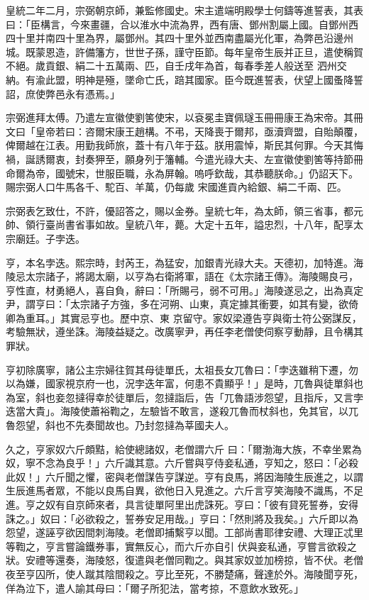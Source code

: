 \begin{pinyinscope}
 皇統二年二月，宗弼朝京師，兼監修國史。宋主遣端明殿學士何鑄等進誓表，其表曰：「臣構言，今來畫疆，合以淮水中流為界，西有唐、鄧州割屬上國。自鄧州西四十里并南四十里為界，屬鄧州。其四十里外並西南盡屬光化軍，為弊邑沿邊州城。既蒙恩造，許備籓方，世世子孫，謹守臣節。每年皇帝生辰并正旦，遣使稱賀不絕。歲貢銀、絹二十五萬兩、匹，自壬戌年為首，每春季差人般送至
 泗州交納。有渝此盟，明神是殛，墜命亡氏，踣其國家。臣今既進誓表，伏望上國蚤降誓詔，庶使弊邑永有憑焉。」



 宗弼進拜太傅。乃遣左宣徽使劉筈使宋，以袞冕圭寶佩璲玉冊冊康王為宋帝。其冊文曰「皇帝若曰：咨爾宋康王趙構。不弔，天降喪于爾邦，亟瀆齊盟，自貽顛覆，俾爾越在江表。用勤我師旅，蓋十有八年于茲。朕用震悼，斯民其何罪。今天其悔禍，誕誘爾衷，封奏狎至，願身列于籓輔。今遣光祿大夫、左宣徽使劉筈等持節冊命爾為帝，國號宋，世服臣職，永為屏翰。嗚呼欽哉，其恭聽朕命。」仍詔天下。賜宗弼人口牛馬各千、駝百、羊萬，仍每歲
 宋國進貢內給銀、絹二千兩、匹。



 宗弼表乞致仕，不許，優詔答之，賜以金券。皇統七年，為太師，領三省事，都元帥、領行臺尚書省事如故。皇統八年，薨。大定十五年，謚忠烈，十八年，配享太宗廟廷。子孛迭。



 亨，本名孛迭。熙宗時，封芮王，為猛安，加銀青光祿大夫。天德初，加特進。海陵忌太宗諸子，將謁太廟，以亨為右衛將軍，語在《太宗諸王傳》。海陵賜良弓，亨性直，材勇絕人，喜自負，辭曰：「所賜弓，弱不可用。」海陵遂忌之，出為真定尹，謂亨曰：「太宗諸子方強，多在河朔、山東，真定據其衝要，如其有變，欲倚卿為重耳。」其實忌亨也。歷中京、東
 京留守。家奴梁遵告亨與衛士符公弼謀反，考驗無狀，遵坐誅。海陵益疑之。改廣寧尹，再任李老僧使伺察亨動靜，且令構其罪狀。



 亨初除廣寧，諸公主宗婦往賀其母徒單氏，太祖長女兀魯曰：「孛迭雖稍下遷，勿以為嫌，國家視京府一也，況孛迭年富，何患不貴顯乎！」是時，兀魯與徒單斜也為室，斜也妾忽撻得幸於徒單后，忽撻詣后，告「兀魯語涉怨望，且指斥，又言孛迭當大貴」。海陵使蕭裕鞫之，左驗皆不敢言，遂殺兀魯而杖斜也，免其官，以兀魯怨望，斜也不先奏聞故也。乃封忽撻為莘國夫人。



 久之，亨家奴六斤頗黠，給使總諸奴，老僧謂六斤
 曰：「爾渤海大族，不幸坐累為奴，寧不念為良乎！」六斤識其意。六斤嘗與亨侍妾私通，亨知之，怒曰：「必殺此奴！」六斤聞之懼，密與老僧謀告亨謀逆。亨有良馬，將因海陵生辰進之，以謂生辰進馬者眾，不能以良馬自異，欲他日入見進之。六斤言亨笑海陵不識馬，不足進。亨之奴有自京師來者，具言徒單阿里出虎誅死。亨曰：「彼有貸死誓券，安得誅之。」奴曰：「必欲殺之，誓券安足用哉。」亨曰：「然則將及我矣。」六斤即以為怨望，遂誣亨欲因間刺海陵。老僧即捕繫亨以聞。工部尚書耶律安禮、大理正忒里等鞫之，亨言嘗論鐵券事，實無反心，而六斤亦自引
 伏與妾私通，亨嘗言欲殺之狀。安禮等還奏，海陵怒，復遣與老僧同鞫之。與其家奴並加榜掠，皆不伏。老僧夜至亨囚所，使人蹴其陰間殺之。亨比至死，不勝楚痛，聲達於外。海陵聞亨死，佯為泣下，遣人諭其母曰：「爾子所犯法，當考掠，不意飲水致死。」




\end{pinyinscope}
